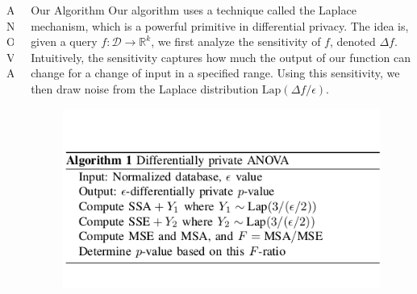 \documentclass[final]{beamer}
\newlength{\onecolwid}
\newlength{\twocolwid}
\begin{document}
\begin{frame}[t]
\begin{columns}[t]
\begin{column}{\twocolwid}
\begin{columns}[t,totalwidth=\twocolwid]
\begin{column}{\onecolwid}
\begin{block}{ANOVA}
{\color{red}{SENTENCES HERE ABOUT MSA, MSE AND F}}

\end{block}



\end{column} %

\begin{column}{\onecolwid}\vspace{-.6in} %


\begin{block}{Our Algorithm}
Our algorithm uses a technique called the Laplace mechanism, which is a powerful primitive in 
differential privacy. The idea is, given a query $f:\mathcal{D}\to\mathbb{R}^{k}$, we first analyze the sensitivity of $f$, denoted $\Delta f$. Intuitively, the sensitivity captures how much the output of our function can change for a change of input in a specified range. Using this sensitivity, we then draw noise from the Laplace distribution $\text{Lap}(\Delta f / \epsilon)$.

\begin{figure}
\includegraphics[width=1.0\linewidth]{algorithm.png}
\end{figure}


\end{block}
\end{column}
\end{columns}
\end{column}
\end{columns}
\end{frame}
\end{document}
